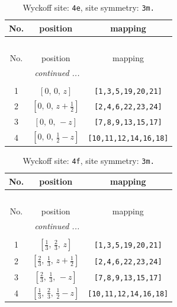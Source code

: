 \documentclass[fleqn,8pt]{jsarticle}
\begin{document}
\begin{longtable}{ccc}
\caption{Wyckoff site: {\tt 4e}, site symmetry: {\tt 3m.}}
 \\
 \hline \hline
No. & position & mapping \\ \hline \endfirsthead

\multicolumn{2}{l}{\tablename\ \thetable{}} \\
 \hline \hline
No. & position & mapping \\ \hline \endhead

 \hline \hline
\multicolumn{2}{r}{\footnotesize\it continued ...} \\ \endfoot

 \hline \hline
\multicolumn{2}{r}{} \\ \endlastfoot

1 & $\left[ 0,\, 0,\, z \right]$ & {\tt [1,3,5,19,20,21]} \\ \hline
2 & $\left[ 0,\, 0,\, z + \frac{1}{2} \right]$ & {\tt [2,4,6,22,23,24]} \\ \hline
3 & $\left[ 0,\, 0,\, - z \right]$ & {\tt [7,8,9,13,15,17]} \\ \hline
4 & $\left[ 0,\, 0,\, \frac{1}{2} - z \right]$ & {\tt [10,11,12,14,16,18]} \\
\end{longtable}
\renewcommand{\arraystretch}{1.2}
\begin{longtable}{ccc}
\caption{Wyckoff site: {\tt 4f}, site symmetry: {\tt 3m.}}
 \\
 \hline \hline
No. & position & mapping \\ \hline \endfirsthead

\multicolumn{2}{l}{\tablename\ \thetable{}} \\
 \hline \hline
No. & position & mapping \\ \hline \endhead

 \hline \hline
\multicolumn{2}{r}{\footnotesize\it continued ...} \\ \endfoot

 \hline \hline
\multicolumn{2}{r}{} \\ \endlastfoot

1 & $\left[ \frac{1}{3},\, \frac{2}{3},\, z \right]$ & {\tt [1,3,5,19,20,21]} \\ \hline
2 & $\left[ \frac{2}{3},\, \frac{1}{3},\, z + \frac{1}{2} \right]$ & {\tt [2,4,6,22,23,24]} \\ \hline
3 & $\left[ \frac{2}{3},\, \frac{1}{3},\, - z \right]$ & {\tt [7,8,9,13,15,17]} \\ \hline
4 & $\left[ \frac{1}{3},\, \frac{2}{3},\, \frac{1}{2} - z \right]$ & {\tt [10,11,12,14,16,18]} \\
\end{longtable}
\end{document}
